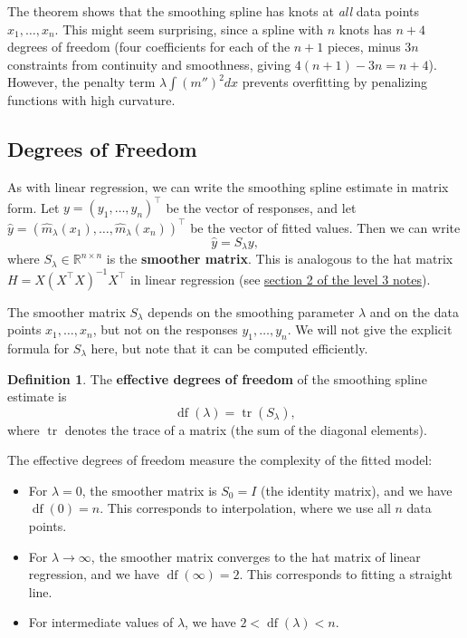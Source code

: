 \documentclass[
  a4paper,
]{article}
\providecommand{\tightlist}{%
  \setlength{\itemsep}{0pt}\setlength{\parskip}{0pt}}
\theoremstyle{definition}
\newtheorem{definition}{Definition}[section]
\theoremstyle{definition}
\theoremstyle{definition}
\theoremstyle{definition}
\theoremstyle{remark}
\begin{document}
The theorem shows that the smoothing spline has knots at \emph{all} data
points \(x_1, \ldots, x_n\). This might seem surprising, since a spline
with \(n\) knots has \(n + 4\) degrees of freedom (four coefficients for each
of the \(n+1\) pieces, minus \(3n\) constraints from continuity and
smoothness, giving \(4(n+1) - 3n = n + 4\)). However, the penalty term
\(\lambda \int (m'')^2 dx\) prevents overfitting by penalizing functions
with high curvature.

\subsection{Degrees of Freedom}\label{degrees-of-freedom}

As with linear regression, we can write the smoothing spline estimate in
matrix form. Let \(y = (y_1, \ldots, y_n)^\top\) be the vector of
responses, and let \(\hat y = (\hat m_\lambda(x_1), \ldots,
\hat m_\lambda(x_n))^\top\) be the vector of fitted values. Then we can
write
\begin{equation}
  \hat y
  = S_\lambda y,  \label{eq:smoother-matrix}
\end{equation}
where \(S_\lambda \in \mathbb{R}^{n\times n}\) is the \textbf{smoother matrix}. This is
analogous to the hat matrix \(H = X(X^\top X)^{-1}X^\top\) in linear
regression (see \href{https://seehuhn.github.io/MATH3714/S02-multiple.html}{section 2 of the level 3
notes}).

The smoother matrix \(S_\lambda\) depends on the smoothing parameter
\(\lambda\) and on the data points \(x_1, \ldots, x_n\), but not on the
responses \(y_1, \ldots, y_n\). We will not give the explicit formula for
\(S_\lambda\) here, but note that it can be computed efficiently.

\begin{definition}
\protect\hypertarget{def:df-spline}{}\label{def:df-spline}The \textbf{effective degrees of freedom} of the smoothing spline estimate is
\begin{equation*}
  \mathop{\mathrm{df}}\nolimits(\lambda)
  = \mathop{\mathrm{tr}}\nolimits(S_\lambda),
\end{equation*}
where \(\mathop{\mathrm{tr}}\nolimits\) denotes the trace of a matrix (the sum of the diagonal
elements).
\end{definition}

The effective degrees of freedom measure the complexity of the fitted
model:

\begin{itemize}
\tightlist
\item
  For \(\lambda = 0\), the smoother matrix is \(S_0 = I\) (the identity
  matrix), and we have \(\mathop{\mathrm{df}}\nolimits(0) = n\). This corresponds to interpolation,
  where we use all \(n\) data points.
\item
  For \(\lambda \to \infty\), the smoother matrix converges to the hat
  matrix of linear regression, and we have \(\mathop{\mathrm{df}}\nolimits(\infty) = 2\). This
  corresponds to fitting a straight line.
\item
  For intermediate values of \(\lambda\), we have \(2 < \mathop{\mathrm{df}}\nolimits(\lambda) < n\).
\end{itemize}
\end{document}
